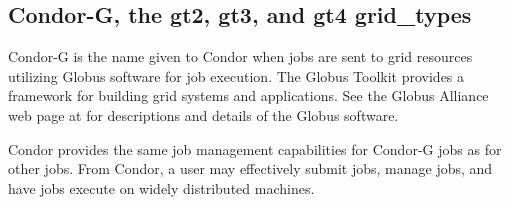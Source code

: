 
\subsection{\label{sec:Condor-G}Condor-G, the gt2, gt3, and gt4 grid\_types}

Condor-G is the name given to Condor when 
 jobs are sent to grid resources utilizing
Globus software for job execution.
The Globus Toolkit provides a framework for building grid systems
and applications.
See the Globus Alliance web page at
for descriptions and details of the Globus software.

Condor provides the same job management capabilities for Condor-G
jobs as for other jobs.
From Condor, a user may effectively submit jobs, manage jobs,
and have jobs execute on widely distributed machines.



